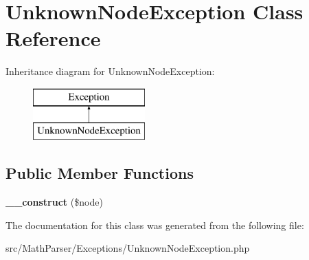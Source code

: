 \hypertarget{classUnknownNodeException}{\section{Unknown\-Node\-Exception Class Reference}
\label{classUnknownNodeException}
}
Inheritance diagram for Unknown\-Node\-Exception\-:\begin{figure}[H]
\begin{center}
\leavevmode
\includegraphics[height=2.000000cm]{classUnknownNodeException}
\end{center}
\end{figure}
\subsection*{Public Member Functions}
\begin{DoxyCompactItemize}
\item 
\hypertarget{classUnknownNodeException_a29ab60f7aaf2118808bb98ed54d02477}{{\bfseries \-\_\-\-\_\-construct} (\$node)}\label{classUnknownNodeException_a29ab60f7aaf2118808bb98ed54d02477}

\end{DoxyCompactItemize}


The documentation for this class was generated from the following file\-:\begin{DoxyCompactItemize}
\item 
src/\-Math\-Parser/\-Exceptions/Unknown\-Node\-Exception.\-php\end{DoxyCompactItemize}
